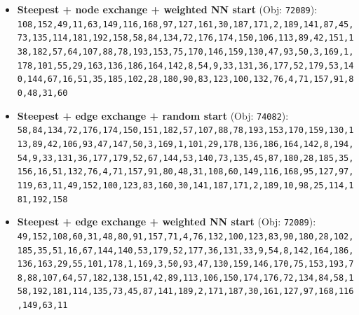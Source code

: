 \begin{itemize}[leftmargin=1.5em]
    \item \textbf{Steepest + node exchange + weighted NN start} (Obj: \texttt{72089}):\\
    \texttt{108,152,49,11,63,149,116,168,97,127,161,30,187,171,2,189,141,87,45,73,135,114,181,192,158,58,84,134,72,176,174,150,106,113,89,42,151,138,182,57,64,107,88,78,193,153,75,170,146,159,130,47,93,50,3,169,1,178,101,55,29,163,136,186,164,142,8,54,9,33,131,36,177,52,179,53,140,144,67,16,51,35,185,102,28,180,90,83,123,100,132,76,4,71,157,91,80,48,31,60}
    \item \textbf{Steepest + edge exchange + random start} (Obj: \texttt{74082}):\\
    \texttt{58,84,134,72,176,174,150,151,182,57,107,88,78,193,153,170,159,130,113,89,42,106,93,47,147,50,3,169,1,101,29,178,136,186,164,142,8,194,54,9,33,131,36,177,179,52,67,144,53,140,73,135,45,87,180,28,185,35,156,16,51,132,76,4,71,157,91,80,48,31,108,60,149,116,168,95,127,97,119,63,11,49,152,100,123,83,160,30,141,187,171,2,189,10,98,25,114,181,192,158}
    \item \textbf{Steepest + edge exchange + weighted NN start} (Obj: \texttt{72089}):\\
    \texttt{49,152,108,60,31,48,80,91,157,71,4,76,132,100,123,83,90,180,28,102,185,35,51,16,67,144,140,53,179,52,177,36,131,33,9,54,8,142,164,186,136,163,29,55,101,178,1,169,3,50,93,47,130,159,146,170,75,153,193,78,88,107,64,57,182,138,151,42,89,113,106,150,174,176,72,134,84,58,158,192,181,114,135,73,45,87,141,189,2,171,187,30,161,127,97,168,116,149,63,11}
\end{itemize}

